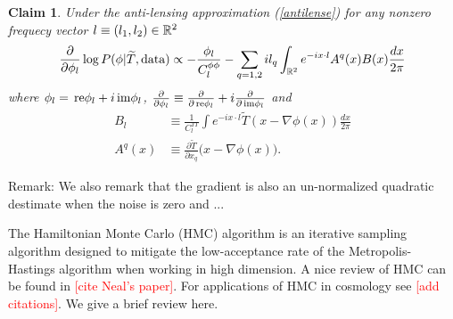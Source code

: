 \documentclass[noinfoline]{imsart}
\newtheorem{claim}{Claim}
\newcommand{\re}{\text{\,\rm re}}
\newcommand{\im}{\text{\,\rm im}}
\begin{document}
\begin{claim}
\label{grad claim}
 Under the anti-lensing approximation (\ref{antilense}) for any nonzero frequecy vector $l\equiv (l_1, l_2) \in \Bbb R^2$ 
 \[\frac{\partial}{\partial \phi_l}\log P(\phi | \widetilde T,  \text{\rm data}) \propto -  \frac{\phi_l}{C^{\phi\phi}_{l}} -  \sum_{q=1,2} i  l_q \int_{\Bbb R^2} e^{-i x\cdot l} A^q(x)B(x) \frac{dx}{2\pi}   \]
 where  $\phi_l = \re \phi_l + i \im \phi_l$, $\frac{\partial}{\partial \phi_l}\equiv \frac{\partial}{\partial\re \phi_l} + i \frac{\partial}{\partial\im\phi_l}$ and 
 \begin{align}
 B_l &\equiv \frac{1}{C_l^{TT}} \int e^{-i x\cdot l}  \widetilde T(x-\nabla \phi(x))\frac{dx}{2\pi} \\ 
 A^q(x) &\equiv \frac{\partial\widetilde T}{\partial x_q}\bigl(x-\nabla \phi(x)\bigr).
 \end{align}
\end{claim}

{\rm Remark:}
We also remark that the gradient is also an un-normalized quadratic destimate when the noise is zero and ...



The Hamiltonian Monte Carlo (HMC) algorithm is an iterative sampling algorithm designed to mitigate the low-acceptance rate of the Metropolis-Hastings algorithm when working in high dimension. A nice review of HMC can be found in \textcolor{red}{[cite Neal's paper]}. For applications of HMC in cosmology see \textcolor{red}{[add citations]}. We give a brief review here. 
\end{document}
